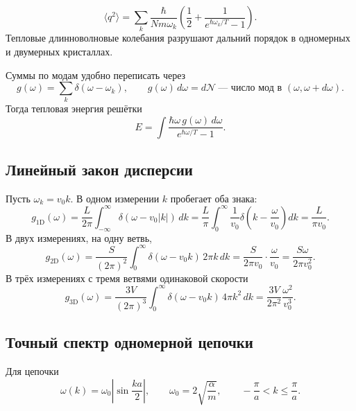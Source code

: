 \documentclass[../final.tex]{subfiles}
\begin{document}
\answer
\[
    \langle q^2\rangle=\sum_k\frac{\hbar}{Nm\omega_k}
       \left(\frac12+\frac1{e^{\hbar\omega_k/T}-1}\right).
\]
 Тепловые длинноволновые колебания разрушают дальний
порядок в одномерных и двумерных кристаллах.
\endgroup


Суммы по модам удобно переписать через 
\[
    g(\omega)=\sum_k\delta(\omega-\omega_k),\qquad
    g(\omega)\,d\omega=d\mathcal N\ \text{--- число мод в }(\omega,\omega+d\omega).
\]
Тогда тепловая энергия решётки
\[
    E=\int\frac{\hbar\omega\,g(\omega)\,d\omega}{e^{\hbar\omega/T}-1}.
\]

\subsection*{Линейный закон дисперсии}

Пусть $\omega_k=v_0k$. В одном измерении $k$ пробегает оба знака:
\[
    g_{1\mathrm D}(\omega)=\frac L{2\pi}\int_{-\infty}^{\infty}
       \delta(\omega-v_0|k|)\,dk
     =\frac L\pi\int_0^\infty\frac1{v_0}
       \delta\left(k-\frac\omega{v_0}\right)dk
     =\frac L{\pi v_0}.
\]
В двух измерениях, на одну ветвь,
\[
    g_{2\mathrm D}(\omega)=\frac S{(2\pi)^2}\int_0^\infty
       \delta(\omega-v_0k)\,2\pi k\,dk
     =\frac S{2\pi v_0}\cdot\frac\omega{v_0}
     =\frac{S\omega}{2\pi v_0^2}.
\]
В трёх измерениях с тремя ветвями одинаковой скорости
\[
    g_{3\mathrm D}(\omega)=\frac{3V}{(2\pi)^3}\int_0^\infty
       \delta(\omega-v_0k)\,4\pi k^2\,dk
     =\frac{3V}{2\pi^2}\frac{\omega^2}{v_0^3}.
\]

\subsection*{Точный спектр одномерной цепочки}

Для цепочки
\[
    \omega(k)=\omega_0\left|\sin\frac{ka}2\right|,\qquad
    \omega_0=2\sqrt{\frac\alpha m},\qquad
    -\frac\pi a<k\le\frac\pi a.
\]
\end{document}
